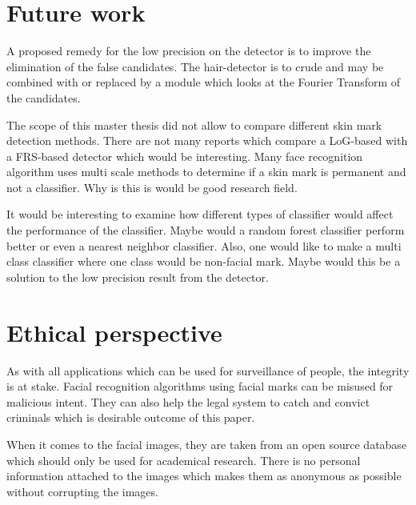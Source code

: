 \section{Future work}

A proposed remedy for the low precision on the detector is to improve the elimination of the false candidates. The hair-detector is to crude and may be combined with or replaced by a module which looks at the Fourier Transform of the candidates. 

The scope of this master thesis did not allow to compare different skin mark detection methods. There are not many reports which compare a LoG-based with a FRS-based detector which would be interesting. Many face recognition algorithm uses multi scale methods to determine if a skin mark is permanent and not a classifier. Why is this is would be good research field.   

It would be interesting to examine how different types of classifier would affect the performance of the classifier. Maybe would a random forest classifier perform better or even a nearest neighbor classifier. Also, one would like to make a multi class classifier where one class would be non-facial mark. Maybe would this be a solution to the low precision result from the detector.  

\section{Ethical perspective}

As with all applications which can be used for surveillance of people, the integrity is at stake. Facial recognition algorithms using facial marks can be misused for malicious intent. They can also help the legal system to catch and convict criminals which is desirable outcome of this paper. 

When it comes to the facial images, they are taken from an open source database which should only be used for academical research. There is no personal information attached to the images which makes them as anonymous as possible without corrupting the images.    